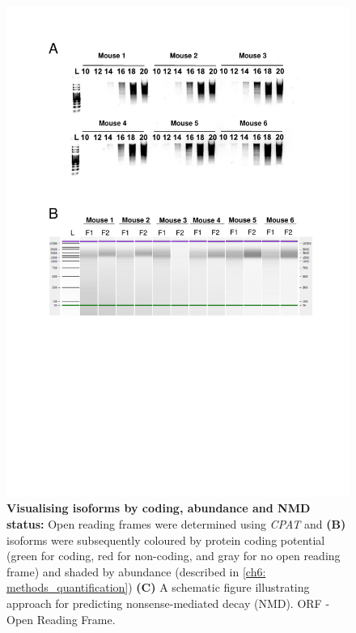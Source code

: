 \begin{figure}[htp]
	\centering
	\includegraphics[page=8,trim={0cm 1cm 0cm 0cm},clip,scale = 0.75]{Figures/TargetedTranscriptome_LabResults}
	\captionsetup{width=0.95\textwidth,singlelinecheck=off}
	\caption[Visualising isoforms by coding, abundance and NMD status]%
	{\textbf{Visualising isoforms by coding, abundance and NMD status:}  Open reading frames were determined using \textit{CPAT} and \textbf{(B)} isoforms were subsequently coloured by protein coding potential (green for coding, red for non-coding, and gray for no open reading frame) and shaded by abundance (described in \cref{ch6: methods_quantification}) \textbf{(C)} A schematic figure illustrating approach for predicting nonsense-mediated decay (NMD). ORF - Open Reading Frame. 
	}
	\label{fig:Targeted_isoforms_cpat}
\end{figure}

